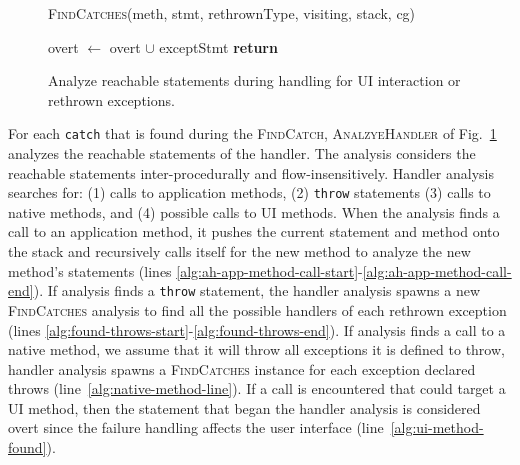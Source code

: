 \begin{figure}[t]
\begin{algorithmic}[1]
\EndFor \label{alg:calc-rethrow-types-end}

\label{alg:findcatches-rethrown-line}
\State \textsc{FindCatches}(meth, stmt, rethrownType, visiting, stack,
cg)

\label{alg:progagate-line}
\State overt $\gets$ overt $\cup$ exceptStmt
\State \textbf{return}
\EndIf
\EndFor
\label{alg:found-throws-end}
\EndIf

\EndFor

\EndProcedure
\end{algorithmic}
\caption{Analyze reachable statements during handling for UI
  interaction or rethrown exceptions.}\label{alg:analyzehandler}
\vspace{-0.1in}
\end{figure}

For each \lstinline!catch! that is found during the
\textsc{FindCatch}, \textsc{AnalzyeHandler} of
Fig.~\ref{alg:analyzehandler} analyzes the reachable statements of
the handler. The analysis considers the reachable statements
inter-procedurally and flow-insens\-itively.  Handler analysis
searches for: (1) calls to application methods, (2) \lstinline!throw!
statements (3) calls to native methods, and (4) possible calls to UI
methods. When the analysis finds a call to an application method, it
pushes the current statement and method onto the stack and recursively
calls itself for the new method to analyze the new method's statements
(lines
\ref{alg:ah-app-method-call-start}-\ref{alg:ah-app-method-call-end}).
If analysis finds a \lstinline!throw!  statement, the handler analysis
spawns a new \textsc{FindCatches} analysis to find all the possible
handlers of each rethrown exception (lines
\ref{alg:found-throws-start}-\ref{alg:found-throws-end}).  If analysis
finds a call to a native method, we assume that it will throw all
exceptions it is defined to throw, handler analysis spawns a
\textsc{FindCatches} instance for each exception declared throws
(line~\ref{alg:native-method-line}).  If a call is encountered that
could target a UI method, then the statement that began the handler
analysis is considered overt since the failure handling affects
the user interface (line~\ref{alg:ui-method-found}).



